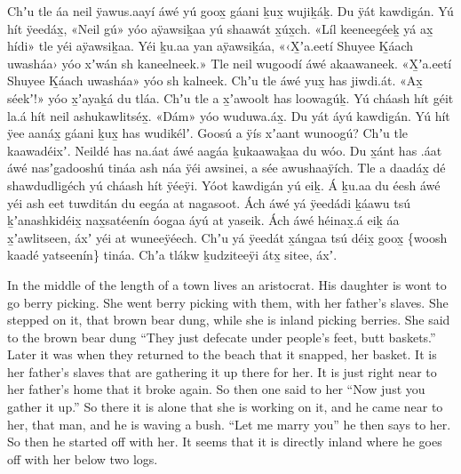 \begin{pairs}
\begin{Leftside}
Chʼu tle áa neil ÿawus.aayí áwé yú goox̱ gáani ḵux̱ wujiḵáḵ.
Du ÿát kawdigán.
Yú hít ÿeedáx̱, «\!Neil gú\!» yóo aÿawsiḵaa yú shaawát x̱úx̱ch.
«\!Líl keeneegéeḵ yá ax̱ hídi\!» tle yéi aÿawsiḵaa.
Yéi ḵu.aa yan aÿawsiḵáa,
«\!‹\!X̱ʼa.eetí Shuyee Ḵáach uwa\-sháa\!› yóo xʼwán sh kaneelneek.\!»
Tle neil wugoodí áwé akaawaneek.
«\!X̱ʼa.eetí Shu\-yee Ḵáach uwasháa\!» yóo sh kalneek.
Chʼu tle áwé yux̱ has jiwdi.át.
«\!Ax̱ séekʼ!\!» yóo x̱ʼayaḵá du tláa.
Chʼu tle a x̱ʼawoolt has loowagúḵ.
Yú cháash hít géit la.á hít neil ashukawlitséx̱.
«\!Dám\!» yóo wuduwa.áx̱.
Du yát áyú kawdigán.
Yú hít ÿee aanáx̱ gáani ḵux̱ has wudikélʼ.
Goosú a ÿís xʼaant wunoogú?
Chʼu tle kaawadéixʼ.
\pend
\pstart
{}Neildé has na.áat áwé aag̱áa ḵukaawaḵaa du wóo.
Du x̱ánt has .áat áwé nasʼgadooshú tináa ash náa ÿéi awsinei, a sée awushaaÿích.
Tle a daadáx̱ dé shawdudlig̱éch yú cháash hít ÿéeÿi.
Yóot kawdigán yú eiḵ.
Á ḵu.aa du éesh áwé yéi ash eet tuwditán du eeg̱áa at nag̱asoot.
Ách áwé yá ÿeedádi ḵáawu tsú ḵʼanashkidéix̱ nax̱satéenín óog̱aa áyú at yaseik.
Ách áwé héinax̱.á eiḵ áa x̱ʼaw\-li\-tseen, áxʼ yéi at wuneeÿéech.
Chʼu yá ÿeedát x̱áng̱aa tsú déix̱ goox̱ \{woosh kaadé yatseenín\} tináa.
Chʼa tlákw ḵudziteeÿi átx̱ sitee, áxʼ.
\pend
\endnumbering
\end{Leftside}
\begin{Rightside}
\beginnumbering
\pstart
\noindent
{}In the middle of the length of a town lives an aristocrat.
His daughter is wont to go berry picking.
She went berry picking with them, with her father’s slaves.
She stepped on it, that brown bear dung, while she is inland picking berries.
She said to the brown bear dung
\qqk{}“They just de\-fecate under people’s feet, butt baskets.”
Later it was when they returned to the beach that it snapped, her basket.
It is her father’s slaves that are gathering it up there for her.
It is just right near to her father’s home that it broke again.
So then one said to her
\qqk{}“Now just you gather it up.”
So there it is alone that she is working on it,
and he came near to her, that man,
and he is waving a bush.
\qqk{}“Let me marry you” he then says to her.
So then he started off with her.
It seems that it is directly inland where he goes off with her below two logs.

\end{Rightside}
\end{pairs}
